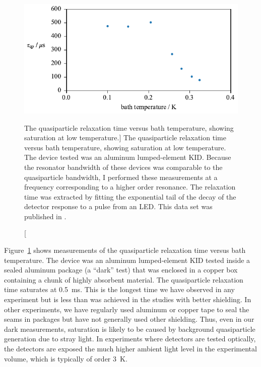 \begin{figure}[tb]
\centering
\includegraphics[width=\textwidth]{theory/tau_qp_vs_bath_temperature.pdf}
\caption
[The quasiparticle relaxation time versus bath temperature, showing saturation at low temperature.]
{
The quasiparticle relaxation time versus bath temperature, showing saturation at low temperature.
The device tested was an aluminum lumped-element KID.
Because the resonator bandwidth of these devices was comparable to the quasiparticle bandwidth, I performed these measurements at a frequency corresponding to a higher order resonance.
The relaxation time was extracted by fitting the exponential tail of the decay of the detector response to a pulse from an LED.
This data set was published in \textcite{McCarrick2014RSI}.
}
\label{fig:tau_qp_vs_bath_temperature}
\end{figure}

Figure~\ref{fig:tau_qp_vs_bath_temperature} shows measurements of the quasiparticle relaxation time versus bath temperature.
The device was an aluminum lumped-element KID tested inside a sealed aluminum package (a ``dark'' test) that was enclosed in a copper box containing a chunk of highly absorbent material.
The quasiparticle relaxation time saturates at \SI{0.5}{ms}.
This is the longest time we have observed in any experiment but is less than was achieved in the studies with better shielding.
In other experiments, we have regularly used aluminum or copper tape to seal the seams in packages but have not generally used other shielding.
Thus, even in our dark measurements, saturation is likely to be caused by background quasiparticle generation due to stray light.
In experiments where detectors are tested optically, the detectors are exposed the much higher ambient light level in the experimental volume, which is typically of order \SI{3}{K}.


